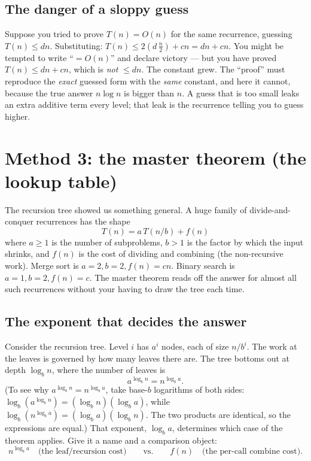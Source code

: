 \subsection{The danger of a sloppy guess}

\begin{trapbox}
Suppose you tried to prove $T(n) = O(n)$ for the same recurrence, guessing
$T(n) \le dn$. Substituting: $T(n) \le 2(d\,\tfrac{n}{2}) + cn = dn + cn$. You
might be tempted to write ``$=O(n)$'' and declare victory --- but you have proved
$T(n) \le dn + cn$, which is \emph{not} $\le dn$. The constant grew. The
``proof'' must reproduce the \emph{exact} guessed form with the \emph{same}
constant, and here it cannot, because the true answer $n\log n$ is bigger
than $n$. A guess that is too small leaks an extra additive term every level; that
leak is the recurrence telling you to guess higher.
\end{trapbox}

\section{Method 3: the master theorem (the lookup table)}

The recursion tree showed us something general. A huge family of
divide-and-conquer recurrences has the shape
\[
\boxed{\,T(n) = a\,T(n/b) + f(n)\,}
\]
where $a \ge 1$ is the number of subproblems, $b > 1$ is the factor by which the
input shrinks, and $f(n)$ is the cost of dividing and combining (the
non-recursive work). Merge sort is $a=2, b=2, f(n)=cn$. Binary search is
$a=1, b=2, f(n)=c$. The master theorem reads off the answer for almost all such
recurrences without your having to draw the tree each time.

\subsection{The exponent that decides the answer}

Consider the recursion tree. Level $i$ has $a^i$ nodes, each of size
$n/b^i$. The work at the leaves is governed by how many leaves there are. The tree
bottoms out at depth $\log_b n$, where the number of leaves is
\[
a^{\log_b n} = n^{\log_b a}.
\]
(To see why $a^{\log_b n} = n^{\log_b a}$, take base-$b$ logarithms of both sides:
$\log_b(a^{\log_b n}) = (\log_b n)(\log_b a)$, while $\log_b(n^{\log_b a}) = (\log_b a)(\log_b n)$.
The two products are identical, so the expressions are equal.)
That exponent, $\log_b a$, determines which case of the theorem applies. Give it a
name and a comparison object:
\[
n^{\log_b a} \quad\text{(the leaf/recursion cost)} \qquad\text{vs.}\qquad
f(n) \quad\text{(the per-call combine cost)}.
\]

